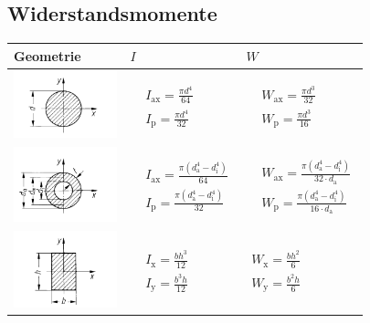 \subsection{Widerstandsmomente}
\begin{table}[H]
\begin{tabularx}{\linewidth}{m{30mm}XX}
	\toprule
	Geometrie & $I$ & $W$ \\
	\midrule
	\includegraphics[width=30mm]{festigkeitslehre/kreis} & $\begin{aligned} & I_\text{ax} = \frac{\pi d^4}{64} \\ &I_\text{p} = \frac{\pi d^4}{32}\end{aligned}$ & $\begin{aligned} &W_\text{ax} = \frac{\pi d^3}{32} \\ &W_\text{p}=\frac{\pi d^3}{16}\end{aligned}$\\ \midrule
	\includegraphics[width=30mm]{festigkeitslehre/kreisring} & $\begin{aligned} & I_\text{ax} = \frac{\pi (d_\text{a}^4-d_\text{i}^4)}{64} \\ &I_\text{p} = \frac{\pi (d_\text{a}^4-d_\text{i}^4)}{32}\end{aligned}$ & $\begin{aligned}& W_\text{ax} = \frac{\pi (d_\text{a}^4-d_\text{i}^4)}{32\cdot d_\text{a}} \\ &W_\text{p}=\frac{\pi (d_\text{a}^4-d_\text{i}^4)}{16\cdot d_\text{a}} \end{aligned}$\\ \midrule
	\includegraphics[width=30mm]{festigkeitslehre/rechteck} & $\begin{aligned} & I_\text{x} = \frac{bh^3}{12} \\ &I_\text{y} = \frac{b^3h}{12} \end{aligned}$ & $\begin{aligned} W_\text{x} = \frac{bh^2}{6} \\ W_\text{y} = \frac{b^2h}{6}\end{aligned}$ \\ \midrule

\end{tabularx}
\end{table}
